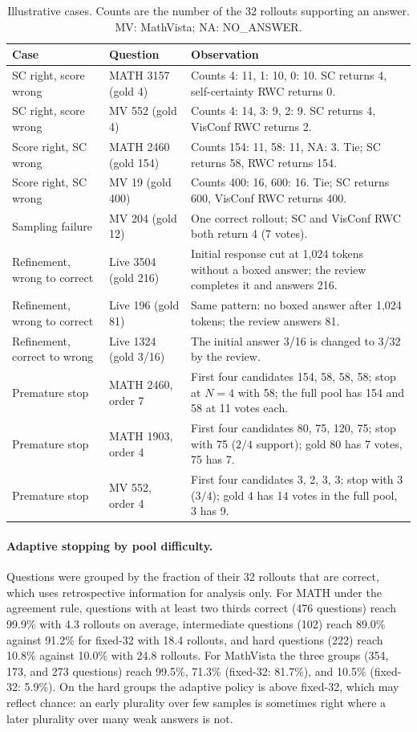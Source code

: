 \documentclass{article}
\begin{document}
\begin{table}[H]
\centering
\caption{Illustrative cases. Counts are the number of the 32 rollouts supporting an answer. MV: MathVista; NA: NO\_ANSWER.}
\label{tab:t3-cases}
\footnotesize
\begin{tabular}{p{2.7cm}lp{7.3cm}}
\toprule
Case & Question & Observation \\
\midrule
SC right, score wrong & MATH 3157 (gold 4) & Counts 4: 11, 1: 10, 0: 10. SC returns 4, self-certainty RWC returns 0. \\
SC right, score wrong & MV 552 (gold 4) & Counts 4: 14, 3: 9, 2: 9. SC returns 4, VisConf RWC returns 2. \\
Score right, SC wrong & MATH 2460 (gold 154) & Counts 154: 11, 58: 11, NA: 3. Tie; SC returns 58, RWC returns 154. \\
Score right, SC wrong & MV 19 (gold 400) & Counts 400: 16, 600: 16. Tie; SC returns 600, VisConf RWC returns 400. \\
Sampling failure & MV 204 (gold 12) & One correct rollout; SC and VisConf RWC both return 4 (7 votes). \\
Refinement, wrong to correct & Live 3504 (gold 216) & Initial response cut at 1,024 tokens without a boxed answer; the review completes it and answers 216. \\
Refinement, wrong to correct & Live 196 (gold 81) & Same pattern: no boxed answer after 1,024 tokens; the review answers 81. \\
Refinement, correct to wrong & Live 1324 (gold 3/16) & The initial answer 3/16 is changed to 3/32 by the review. \\
Premature stop & MATH 2460, order 7 & First four candidates 154, 58, 58, 58; stop at $N=4$ with 58; the full pool has 154 and 58 at 11 votes each. \\
Premature stop & MATH 1903, order 4 & First four candidates 80, 75, 120, 75; stop with 75 ($2/4$ support); gold 80 has 7 votes, 75 has 7. \\
Premature stop & MV 552, order 4 & First four candidates 3, 2, 3, 3; stop with 3 ($3/4$); gold 4 has 14 votes in the full pool, 3 has 9. \\
\bottomrule
\end{tabular}
\end{table}

\paragraph{Adaptive stopping by pool difficulty.} Questions were grouped by the fraction of their 32 rollouts that are correct, which uses retrospective information for analysis only. For MATH under the agreement rule, questions with at least two thirds correct (476 questions) reach 99.9\% with 4.3 rollouts on average, intermediate questions (102) reach 89.0\% against 91.2\% for fixed-32 with 18.4 rollouts, and hard questions (222) reach 10.8\% against 10.0\% with 24.8 rollouts. For MathVista the three groups (354, 173, and 273 questions) reach 99.5\%, 71.3\% (fixed-32: 81.7\%), and 10.5\% (fixed-32: 5.9\%). On the hard groups the adaptive policy is above fixed-32, which may reflect chance: an early plurality over few samples is sometimes right where a later plurality over many weak answers is not.
\end{document}
